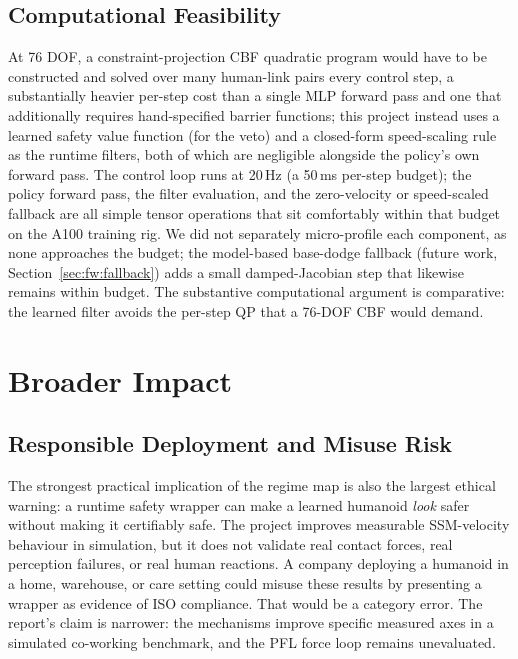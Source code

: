 \documentclass[11pt,a4paper]{report}
\newcommand{\ssm}{SSM}
\newcommand{\pfl}{PFL}
\begin{document}
\subsection{Computational Feasibility}
\label{sec:disc:compute}

At 76 DOF, a constraint-projection CBF quadratic program would have to
be constructed and solved over many human-link pairs every control
step, a substantially heavier per-step cost than a single MLP forward
pass and one that additionally requires hand-specified barrier
functions; this project instead uses a learned safety value function
(for the veto) and a closed-form speed-scaling rule as the runtime
filters, both of which are negligible alongside the policy's own
forward pass. The control loop runs at 20\,Hz (a 50\,ms per-step
budget); the policy forward pass, the filter evaluation, and the
zero-velocity or speed-scaled fallback are all simple tensor
operations that sit comfortably within that budget on the A100
training rig. We did not separately micro-profile each component, as
none approaches the budget; the model-based base-dodge fallback
(future work, Section~\ref{sec:fw:fallback}) adds a small
damped-Jacobian step that likewise remains within budget. The
substantive computational argument is comparative: the learned filter
avoids the per-step QP that a 76-DOF CBF would demand.

\section{Broader Impact}
\label{sec:disc:broader}

\subsection{Responsible Deployment and Misuse Risk}

The strongest practical implication of the regime map is also the
largest ethical warning: a runtime safety wrapper can make a learned
humanoid \emph{look} safer without making it certifiably safe. The
project improves measurable \ssm{}-velocity behaviour in simulation,
but it does not validate real contact forces, real perception
failures, or real human reactions. A company deploying a humanoid in a
home, warehouse, or care setting could misuse these results by
presenting a wrapper as evidence of ISO compliance. That would be a
category error. The report's claim is narrower: the mechanisms improve
specific measured axes in a simulated co-working benchmark, and the
\pfl{} force loop remains unevaluated.
\end{document}
